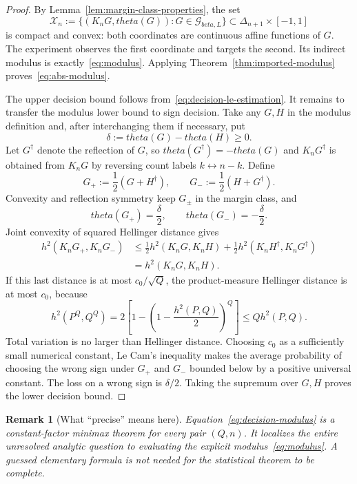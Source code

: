 \documentclass[11pt]{article}
\def\beta{beta}%
\def\theta{theta}%
\newtheorem{remark}[theorem]{Remark}
\newcommand{\calG}{\mathcal G}
\begin{document}
\begin{proof}
By Lemma~\ref{lem:margin-class-properties}, the set
\[
\mathcal X_n
:=
\{(K_nG,\theta(G)):G\in\calG_{\beta,L}\}
\subset\Delta_{n+1}\times[-1,1]
\]
is compact and convex: both coordinates are continuous affine functions of $G$.  The experiment observes the first coordinate and targets the second.  Its indirect modulus is exactly~\eqref{eq:modulus}.  Applying Theorem~\ref{thm:imported-modulus} proves~\eqref{eq:abs-modulus}.

The upper decision bound follows from~\eqref{eq:decision-le-estimation}.  It remains to transfer the modulus lower bound to sign decision.  Take any $G,H$ in the modulus definition and, after interchanging them if necessary, put
\[
\delta:=\theta(G)-\theta(H)\ge0.
\]
Let $G^\dagger$ denote the reflection of $G$, so $\theta(G^\dagger)=-\theta(G)$ and $K_nG^\dagger$ is obtained from $K_nG$ by reversing count labels $k\leftrightarrow n-k$.  Define
\[
G_+:=\frac12(G+H^\dagger),
\qquad
G_-:=\frac12(H+G^\dagger).
\]
Convexity and reflection symmetry keep $G_\pm$ in the margin class, and
\[
\theta(G_+)=\frac\delta2,
\qquad
\theta(G_-)=-\frac\delta2.
\]
Joint convexity of squared Hellinger distance gives
\begin{align*}
h^2(K_nG_+,K_nG_-)
&\le\frac12h^2(K_nG,K_nH)
 +\frac12h^2(K_nH^\dagger,K_nG^\dagger)\\
&=h^2(K_nG,K_nH).
\end{align*}
If this last distance is at most $c_0/\sqrt Q$, the product-measure Hellinger distance is at most $c_0$, because
\[
h^2(P^Q,Q^Q)
=2\left[1-\left(1-\frac{h^2(P,Q)}2\right)^Q\right]
\le Qh^2(P,Q).
\]
Total variation is no larger than Hellinger distance.  Choosing $c_0$ as a sufficiently small numerical constant, Le Cam's inequality makes the average probability of choosing the wrong sign under $G_+$ and $G_-$ bounded below by a positive universal constant.  The loss on a wrong sign is $\delta/2$.  Taking the supremum over $G,H$ proves the lower decision bound.
\end{proof}

\begin{remark}[What ``precise'' means here]
Equation~\eqref{eq:decision-modulus} is a constant-factor minimax theorem for every pair $(Q,n)$.  It localizes the entire unresolved analytic question to evaluating the explicit modulus~\eqref{eq:modulus}.  A guessed elementary formula is not needed for the statistical theorem to be complete.
\end{remark}
\end{document}
